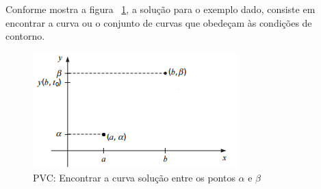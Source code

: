 Conforme mostra a figura ~\ref{fig:pvc}, a solução para o exemplo dado, consiste em encontrar a curva ou o conjunto de curvas que obedeçam às condições de contorno.

\begin{figure}[ht!]
\centering
\includegraphics[scale=0.8]{figuras/PVC.png}
\caption{PVC: Encontrar a curva solução entre os pontos $ \alpha $ e $ \beta $}
\label{fig:pvc}
\end{figure}
